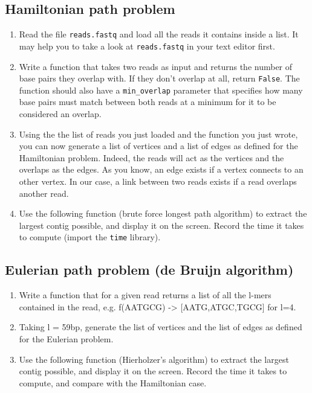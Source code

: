 \documentclass[a4paper,11pt]{article}
\begin{document}
\subsection{Hamiltonian path problem}
\begin{enumerate}
\item Read the file \texttt{reads.fastq} and load all the reads it contains inside a list. It may help you to take a look at \texttt{reads.fastq} in your text editor first.
\item Write a function that takes two reads as input and returns the number of base pairs they overlap with. If they don't overlap at all, return \texttt{False}. The function should also have a \texttt{min\_overlap} parameter that specifies how many base pairs must match between both reads at a minimum for it to be considered an overlap.
\item Using the the list of reads you just loaded and the function you just wrote, you can now generate a list of vertices and a list of edges as defined for the Hamiltonian problem. Indeed, the reads will act as the vertices and the overlaps as the edges. As you know, an edge exists if a vertex connects to an other vertex. In our case, a link between two reads exists if a read overlaps another read.
\item Use the following function (brute force longest path algorithm) to extract the largest contig possible, and display it on the screen. Record the time it takes to compute (import the \texttt{time} library).
\end{enumerate}
\subsection{Eulerian path problem (de Bruijn algorithm)}
\begin{enumerate}
\item Write a function that for a given read returns a list of all the l-mers contained in the read, e.g.
f(AATGCG) ->  [AATG,ATGC,TGCG] for l=4.
\item Taking l = 59bp, generate the list of vertices and the list of edges as defined for the Eulerian problem.
\item Use the following function (Hierholzer's algorithm) to extract the largest contig possible, and display it on the screen. Record the time it takes to compute, and compare with the Hamiltonian case.
\end{enumerate}

\newpage
\end{document}
